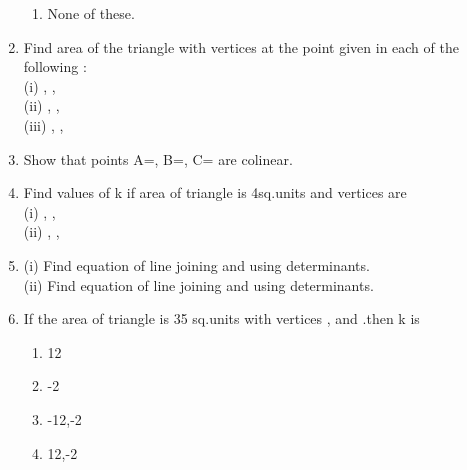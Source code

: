 \begin{enumerate}[label=\arabic*.,ref=\thesubsection.\theenumi]
\begin{enumerate}
\item None of these.
\end{enumerate}
\item Find area of the triangle with vertices at the point given in each of the following :\\
(i) , , \\
(ii) , , \\
(iii) , , \\
\item Show that points A=, B=, C= are colinear.
\item Find values of k if area of triangle is 4sq.units and vertices are \\
(i) , ,  \\ (ii) , , 
\item (i) Find equation of line joining  and  using determinants.\\
(ii) Find equation of line joining  and  using determinants.
\item If the area of triangle is 35 sq.units with vertices ,  and .then k is 
\begin{enumerate}
\item 12
\item -2
\item -12,-2
\item 12,-2
\end{enumerate}


\end{enumerate}
